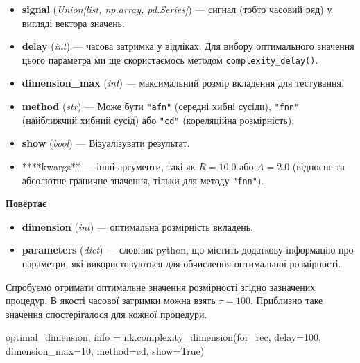 \documentclass[
  letterpaper,
]{report}
\newenvironment{Shaded}{\begin{snugshade}}{\end{snugshade}}
\newcommand{\DecValTok}[1]{\textcolor[rgb]{0.68,0.00,0.00}{#1}}
\newcommand{\NormalTok}[1]{\textcolor[rgb]{0.00,0.23,0.31}{#1}}
\newcommand{\OperatorTok}[1]{\textcolor[rgb]{0.37,0.37,0.37}{#1}}
\newcommand{\StringTok}[1]{\textcolor[rgb]{0.13,0.47,0.30}{#1}}
\newcommand{\VariableTok}[1]{\textcolor[rgb]{0.07,0.07,0.07}{#1}}
\providecommand{\tightlist}{%
  \setlength{\itemsep}{0pt}\setlength{\parskip}{0pt}}\usepackage{longtable,booktabs,array}
\begin{document}
\begin{itemize}
\tightlist
\item
  \textbf{signal} (\emph{Union{[}list, np.array, pd.Series{]}}) ---
  сигнал (тобто часовий ряд) у вигляді вектора значень.
\item
  \textbf{delay} (\emph{int}) --- часова затримка у відліках. Для вибору
  оптимального значення цього параметра ми ще скористаємось методом
  \texttt{complexity\_delay()}.
\item
  \textbf{dimension\_max} (\emph{int}) --- максимальний розмір вкладення
  для тестування.
\item
  \textbf{method} (\emph{str}) --- Може бути \texttt{"afn"} (середні
  хибні сусіди), \texttt{"fnn"} (найближчий хибний сусід) або
  \texttt{"cd"} (кореляційна розмірність).
\item
  \textbf{show} (\emph{bool}) --- Візуалізувати результат.
\item
  ****kwargs** --- інші аргументи, такі як \(R=10.0\) або \(A=2.0\)
  (відносне та абсолютне граничне значення, тільки для методу
  \texttt{"fnn"}).
\end{itemize}

\textbf{Повертає}

\begin{itemize}
\tightlist
\item
  \textbf{dimension} (\emph{int}) --- оптимальна розмірність вкладень.
\item
  \textbf{parameters} (\emph{dict}) --- словник python, що містить
  додаткову інформацію про параметри, які використовуються для
  обчислення оптимальної розмірності.
\end{itemize}

Спробуємо отримати оптимальне значення розмірності згідно зазначених
процедур. В якості часової затримки можна взять \(\tau=100\). Приблизно
таке значення спостерігалося для кожної процедури.

\begin{Shaded}
\begin{Highlighting}[]
\NormalTok{optimal\_dimension, info }\OperatorTok{=}\NormalTok{ nk.complexity\_dimension(for\_rec,}
\NormalTok{                                                  delay}\OperatorTok{=}\DecValTok{100}\NormalTok{,}
\NormalTok{                                                  dimension\_max}\OperatorTok{=}\DecValTok{10}\NormalTok{,}
\NormalTok{                                                  method}\OperatorTok{=}\StringTok{\textquotesingle{}cd\textquotesingle{}}\NormalTok{,}
\NormalTok{                                                  show}\OperatorTok{=}\VariableTok{True}\NormalTok{)}
\end{Highlighting}
\end{Shaded}
\end{document}
